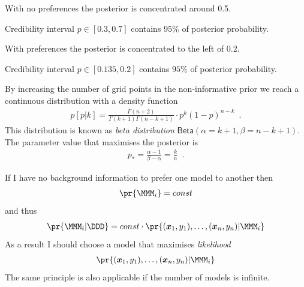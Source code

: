 \documentclass[landscape,footrule]{foils}
\renewcommand{\vec}[1]{\boldsymbol{#1}}
\begin{document}
\begin{triangles}
\item With no preferences the posterior is concentrated around 0.5.
\item Credibility interval $p\in[0.3,0.7]$ contains $95\%$ of posterior probability.
\end{triangles}


\vspace*{-0.5cm}

\begin{triangles}
\item With preferences the posterior is concentrated to the left of 0.2.
\item Credibility interval $p\in[0.135,0.2]$ contains $95\%$ of posterior probability.
\end{triangles}


By increasing the number of grid points in the non-informative prior we reach a continuous distribution with a density function
\begin{align*}  
p[p|k] = \frac{\Gamma(n+2)}{\Gamma(k+1)\Gamma(n-k+1)}\cdot p^k(1-p)^{n-k}\enspace.
\end{align*}
This distribution is known as \emph{beta distribution} $\mathsf{Beta}(\alpha=k+1, \beta=n-k+1)$.
The parameter value that maximises the posterior is 
\begin{align*}
p_* =\frac{\alpha-1}{\beta-\alpha}=\frac{k}{n}\enspace.
\end{align*} 


If I have no background information to prefer one model to another then 
\begin{align*}
  \pr{\MMM_i}=const
\end{align*}
and thus 
\begin{align*}
  \pr{\MMM_i|\DDD} = const\cdot \pr{(\vec{x}_1,y_1),\ldots,(\vec{x}_n,
          y_n)|\MMM_i}
\end{align*}
As a result I should choose a model that maximises \emph{likelihood}
\begin{align*}
  \pr{(\vec{x}_1,y_1),\ldots,(\vec{x}_n, y_n)|\MMM_i}
\end{align*}
The same principle is also applicable if the number of models is infinite.

\end{document}
